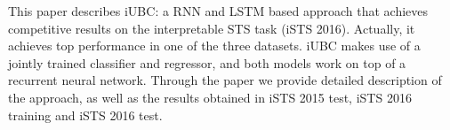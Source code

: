 This paper describes iUBC: a RNN and LSTM based approach that achieves competitive results on the interpretable STS task (iSTS 2016). Actually, it achieves top performance in one of the three datasets. iUBC makes use of a jointly trained classifier and regressor, and both models work on top of a recurrent neural network. Through the paper we provide detailed description of the approach, as well as the results obtained in iSTS 2015 test, iSTS 2016 training and iSTS 2016 test.
